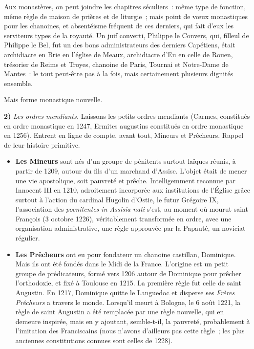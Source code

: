 \documentclass[french,twoside]{book} %
\newcommand{\labelchar}[1]{\textbf{\color{rubric} #1}}
\begin{document}
\noindent Aux monastères, on peut joindre les chapitres séculiers : même type de fonction, même règle de maison de prières et de liturgie ; mais point de vœux monastiques pour les chanoines, et absentéisme fréquent de ces derniers, qui fait d’eux les serviteurs types de la royauté. Un juif converti, Philippe le Convers, qui, filleul de Philippe le Bel, fut un des bons administrateurs des derniers Capétiens, était archidiacre en Brie en l’église de Meaux, archidiacre d’Eu en celle de Rouen, trésorier de Reims et Troyes, chanoine de Paris, Tournai et Notre-Dame de Mantes : le tout peut-être pas à la fois, mais certainement plusieurs dignités ensemble.\par
Mais forme monastique nouvelle.\par
\bigbreak
\noindent \labelchar{2)} {\itshape Les ordres mendiants.} Laissons les petits ordres mendiants (Carmes, constitués en ordre monastique en 1247, Ermites augustins constitués en ordre monastique en 1256). Entrent en ligne de compte, avant tout, Mineurs et Prêcheurs. Rappel de leur histoire primitive.\par

\begin{itemize}[itemsep=0pt,]
\item \textbf{Les Mineurs} sont nés d’un groupe de pénitents surtout laïques réunis, à partir de 1209, autour du fils d’un marchand d’Assise. L’objet était de mener une vie apostolique, soit pauvreté et prêche. Intelligemment reconnue par Innocent III en 1210, adroitement incorporée aux institutions de l’Église grâce surtout à l’action du cardinal Hugolin d’Ostie, le futur Grégoire IX, l’association des {\itshape poenitentes in Assisia nati} s’est, au moment où mourut saint François (3 octobre 1226), véritablement transformée en ordre, avec une organisation administrative, une règle approuvée par la Papauté, un noviciat régulier.
\item \textbf{Les Prêcheurs} ont eu pour fondateur un chanoine castillan, Dominique. Mais ils ont été fondés dans le Midi de la France.  
\label{p111} L’origine est un petit groupe de prédicateurs, formé vers 1206 autour de Dominique pour prêcher l’orthodoxie, et fixé à Toulouse en 1215. La première règle fut celle de saint Augustin. En 1217, Dominique quitte le Languedoc et disperse ses \emph{Frères Prêcheurs} a travers le monde. Lorsqu’il meurt à Bologne, le 6 août 1221, la règle de saint Augustin a été remplacée par une règle nouvelle, qui en demeure inspirée, mais en y ajoutant, semble-t-il, la pauvreté, probablement à l’imitation des Franciscains (nous n’avons d’ailleurs pas cette règle ; les plus anciennes constitutions connues sont celles de 1228).
\end{itemize}
\end{document}
